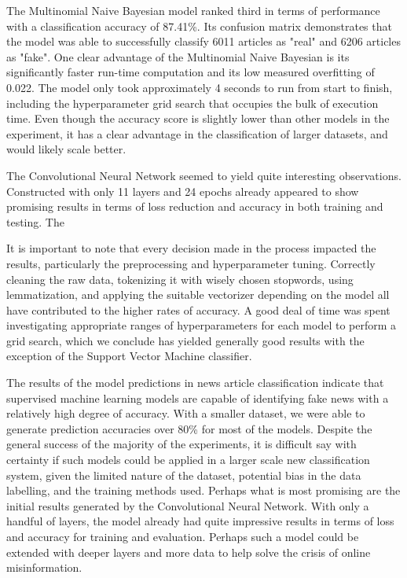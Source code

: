 \documentclass[10pt,twocolumn,letterpaper]{article}
\begin{document}
The Multinomial Naive Bayesian model ranked third in terms of performance with a classification accuracy of 87.41\%. Its confusion matrix demonstrates that the model was able to successfully classify 6011 articles as "real" and 6206 articles as "fake". One clear advantage of the Multinomial Naive Bayesian is its significantly faster run-time computation and its low measured overfitting of 0.022. The model only took approximately 4 seconds to run from start to finish, including the hyperparameter grid search that occupies the bulk of execution time. Even though the accuracy score is slightly lower than other models in the experiment, it has a clear advantage in the classification of larger datasets, and would likely scale better. \par

The Convolutional Neural Network seemed to yield quite interesting observations. Constructed with only 11 layers and 24 epochs already appeared to show promising results in terms of loss reduction and accuracy in both training and testing. The \par

It is important to note that every decision made in the process impacted the results, particularly the preprocessing and hyperparameter tuning. Correctly cleaning the raw data, tokenizing it with wisely chosen stopwords, using lemmatization, and applying the suitable vectorizer depending on the model all have contributed to the higher rates of accuracy. A good deal of time was spent investigating appropriate ranges of hyperparameters for each model to perform a grid search, which we conclude has yielded generally good results with the exception of the Support Vector Machine classifier.

The results of the model predictions in news article classification indicate that supervised machine learning models are capable of identifying fake news with a relatively high degree of accuracy. With a smaller dataset, we were able to generate prediction accuracies over 80\% for most of the models. Despite the general success of the majority of the experiments, it is difficult say with certainty if such models could be applied in a larger scale new classification system, given the limited nature of the dataset, potential bias in the data labelling, and the training methods used. Perhaps what is most promising are the initial results generated by the Convolutional Neural Network. With only a handful of layers, the model already had quite impressive results in terms of loss and accuracy for training and evaluation. Perhaps such a model could be extended with deeper layers and more data to help solve the crisis of online misinformation.
\end{document}
